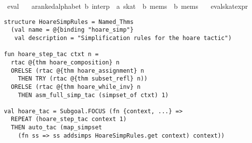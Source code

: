 \documentclass{llncs}
\begin{document}
\begin{isabellebody}
\isanewline
{}\isamarkupfalse%
\ eval\ {}{}\isanewline
\ \ {}{}{}a{}{}ranked{}alphabet{}\ {}b{}\ interp\ {}\ {}a\ skat\ {}\ {}b\ mems\ {}\ {}b\ mems{}\isanewline
\ \ \ eval{}skat{}expr\isanewline
\end{isabellebody}

{
\small
\begin{verbatim}
structure HoareSimpRules = Named_Thms
  (val name = @{binding "hoare_simp"}
   val description = "Simplification rules for the hoare tactic")

fun hoare_step_tac ctxt n =
  rtac @{thm hoare_composition} n
  ORELSE (rtac @{thm hoare_assignment} n
    THEN TRY (rtac @{thm subset_refl} n))
  ORELSE (rtac @{thm hoare_while_inv} n
    THEN asm_full_simp_tac (simpset_of ctxt) 1)

val hoare_tac = Subgoal.FOCUS (fn {context, ...} =>
  REPEAT (hoare_step_tac context 1)
  THEN auto_tac (map_simpset
    (fn ss => ss addsimps HoareSimpRules.get context) context))
\end{verbatim}
}
\end{document}
